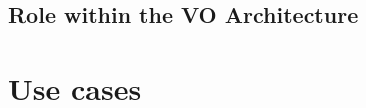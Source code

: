 \documentclass[11pt,a4paper]{ivoa}
\begin{document}
\subsection{Role within the VO Architecture}








\section{Use cases}
\end{document}
